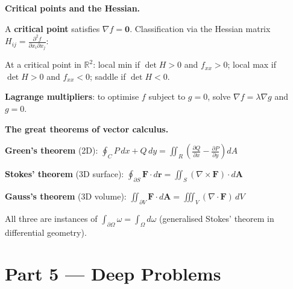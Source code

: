 \documentclass[12pt, a4paper]{article}
\begin{document}
\begin{namebox}
\textbf{Critical points and the Hessian.}

A \textbf{critical point} satisfies $\nabla f = \mathbf{0}$. Classification via the Hessian matrix $H_{ij} = \frac{\partial^2 f}{\partial x_i \partial x_j}$:

At a critical point in $\mathbb{R}^2$: local min if $\det H > 0$ and $f_{xx} > 0$; local max if $\det H > 0$ and $f_{xx} < 0$; saddle if $\det H < 0$.

\textbf{Lagrange multipliers}: to optimise $f$ subject to $g = 0$, solve $\nabla f = \lambda \nabla g$ and $g = 0$.
\end{namebox}

\begin{namebox}
\textbf{The great theorems of vector calculus.}

\textbf{Green's theorem} (2D): $\oint_C P\,dx + Q\,dy = \iint_R \left(\frac{\partial Q}{\partial x} - \frac{\partial P}{\partial y}\right)dA$

\textbf{Stokes' theorem} (3D surface): $\oint_{\partial S} \mathbf{F}\cdot d\mathbf{r} = \iint_S (\nabla\times\mathbf{F})\cdot d\mathbf{A}$

\textbf{Gauss's theorem} (3D volume): $\iint_{\partial V} \mathbf{F}\cdot d\mathbf{A} = \iiint_V (\nabla\cdot\mathbf{F})\,dV$

All three are instances of $\int_{\partial\Omega} \omega = \int_{\Omega} d\omega$ (generalised Stokes' theorem in differential geometry).
\end{namebox}

\section{Part 5 \texorpdfstring{---}{--} Deep Problems}
\end{document}
